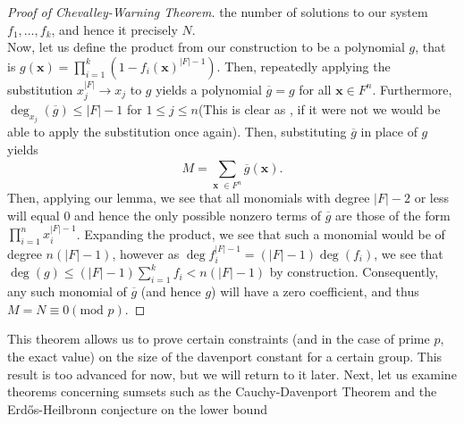 \begin{proof}[Proof of
Chevalley-Warning Theorem]
the number of solutions to our system $f_1, \ldots, f_{k}$, and hence it
precisely $N$.\\ Now, let us define the product from our construction to be a
polynomial  $g$, that is $g\left( \textbf{x} \right) = \prod_{i= 1}^{k} \left(
	1-f_{i}\left( \textbf{x} \right) ^{\left| F \right| -1} \right)$. Then,
	repeatedly applying the substitution $ x_{j}^{\left| F \right| } \to
	x_{j}$ to $g$ yields a polynomial $\overline{g} = g$ for all
	$\textbf{x}\in F^{n}$. Furthermore, $ \deg _{ x_j} \left(  \overline{g}
	\right) \le \left| F \right| -1$ for $1 \le j \le n$(This is clear as ,
	if it were not we would be able to apply the substitution once again).
	Then, substituting $\overline{g}$ in place of $g$ yields \[ M =
	\sum_{\textbf{x } \in F^{n}}^{} \overline{g}\left( \textbf{x} \right)
.\] Then, applying our lemma, we see that all monomials with degree $\left| F
\right|  -2$ or less will equal $0$ and hence the only possible nonzero terms
of $\overline{g}$ are those of the form $ \prod_{i= 1}^{n}  x_{i}^{\left| F
\right| -1}$. Expanding the product, we see that such a monomial would be of
degree $n\left(\left| F \right| - 1 \right)$, however as $\deg f_{i} ^{\left| F
\right| -1} = \left( \left| F \right| -1 \right) \deg \left( f_{i} \right)$, we
see that $\deg \left( g \right) \le \left( \left| F \right| -1 \right) \sum_{i=
1}^{k} f_{i} < n\left( \left| F \right| -1 \right)$ by construction.
Consequently, any such monomial of $\overline{g}$ (and hence $g$) will have a
zero coefficient, and thus $M = N \equiv 0 \left( \text{mod } p \right) $.
\end{proof} This theorem allows us to prove certain constraints (and in the
case of prime  $p$, the exact value) on the size of the davenport constant for
a certain group. This result is too advanced for now, but we will return to it
later. Next, let us examine theorems concerning sumsets such as the
Cauchy-Davenport Theorem and the Erdős-Heilbronn conjecture on the lower bound
